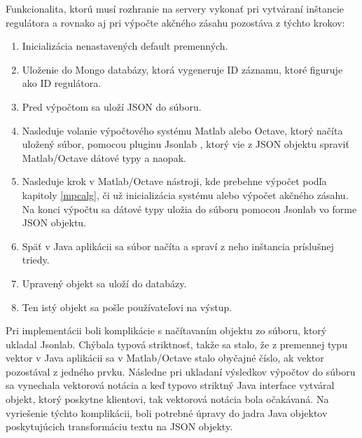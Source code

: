 Funkcionalita, ktorú musí rozhranie na servery vykonať pri vytváraní inštancie regulátora a rovnako aj pri výpočte akčného zásahu pozostáva z týchto krokov:
\begin{enumerate}
  \item Inicializácia nenastavených default premenných.
  \item Uloženie do Mongo databázy, ktorá vygeneruje ID záznamu, ktoré figuruje ako ID regulátora.
  \item  Pred výpočtom sa uloží JSON do súboru.  
  \item Nasleduje volanie výpočtového systému Matlab alebo
   Octave, ktorý načíta uložený súbor, pomocou pluginu Jsonlab \cite{IOT29}, ktorý vie z JSON objektu spraviť Matlab/Octave dátové typy a naopak.
  \item Nasleduje krok v Matlab/Octave nástroji, kde prebehne výpočet podľa kapitoly \ref{mpcalg}, či už inicializácia systému alebo výpočet akčného zásahu. Na konci výpočtu sa dátové typy uložia do súboru pomocou Jsonlab vo forme JSON objektu.
  \item Späť v Java aplikácii sa súbor načíta a spraví z neho inštancia príslušnej triedy. 
  \item Upravený objekt sa uloží do databázy.
  \item Ten istý objekt sa pošle používateľovi na výstup.
\end{enumerate} 
Pri implementácii boli komplikácie s načítavaním objektu zo súboru, ktorý ukladal Jsonlab. Chýbala typová striktnosť, takže sa stalo, že z premennej typu vektor v Java aplikácii sa v Matlab/Octave stalo obyčajné číslo, ak vektor pozostával z jedného prvku. Následne pri ukladaní výsledkov výpočtov do súboru sa vynechala vektorová notácia a keď typovo striktný Java interface vytváral objekt, ktorý poskytne klientovi, tak vektorová notácia bola očakávaná. Na vyriešenie týchto komplikácii, boli potrebné úpravy do jadra Java objektov poskytujúcich transformáciu textu na JSON objekty. 

